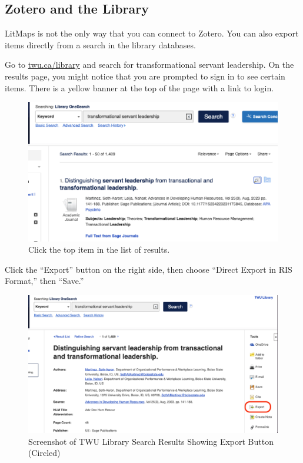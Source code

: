 \documentclass[
  letterpaper,
  DIV=11,
  numbers=noendperiod]{scrreprt}
\begin{document}
\subsection*{Zotero and the Library}\label{zotero-and-the-library}

LitMaps is not the only way that you can connect to Zotero. You can also
export items directly from a search in the library databases.

Go to \href{https://twu.ca/library}{twu.ca/library} and search for
transformational servant leadership. On the results page, you might
notice that you are prompted to sign in to see certain items. There is a
yellow banner at the top of the page with a link to login.

\begin{figure}

\caption{\label{fig-library1}Click the top item in the list of results.}

\includegraphics{assets/u2/library1.png}

\end{figure}%

Click the ``Export'' button on the right side, then choose ``Direct
Export in RIS Format,'' then ``Save.''

\begin{figure}

\caption{\label{fig-library2}Screenshot of TWU Library Search Results
Showing Export Button (Circled)}

\includegraphics{assets/u2/library2.png}

\end{figure}%
\end{document}
